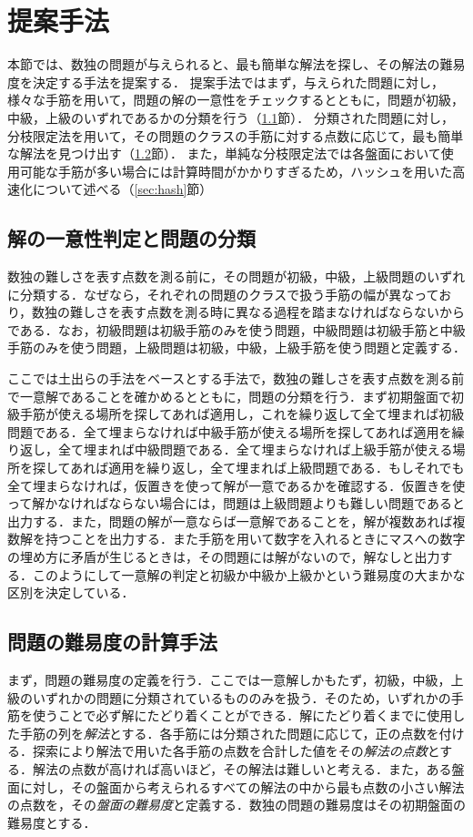 \documentclass[submit,techrep,noauthor]{ipsj}
\begin{document}
\section{提案手法}
本節では、数独の問題が与えられると、最も簡単な解法を探し、その解法の難易度を決定する手法を提案する．
提案手法ではまず，与えられた問題に対し，様々な手筋を用いて，問題の解の一意性をチェックするとともに，問題が初級，中級，上級のいずれであるかの分類を行う（\ref{sec:classify}節）．
分類された問題に対し，分枝限定法を用いて，その問題のクラスの手筋に対する点数に応じて，最も簡単な解法を見つけ出す（\ref{sec:algo}節）．
また，単純な分枝限定法では各盤面において使用可能な手筋が多い場合には計算時間がかかりすぎるため，ハッシュを用いた高速化について述べる（\ref{sec:hash}節）


\subsection{解の一意性判定と問題の分類}
\label{sec:classify}
数独の難しさを表す点数を測る前に，その問題が初級，中級，上級問題のいずれに分類する．なぜなら，それぞれの問題のクラスで扱う手筋の幅が異なっており，数独の難しさを表す点数を測る時に異なる過程を踏まなければならないからである．なお，初級問題は初級手筋のみを使う問題，中級問題は初級手筋と中級手筋のみを使う問題，上級問題は初級，中級，上級手筋を使う問題と定義する．

ここでは土出らの手法をベースとする手法で，数独の難しさを表す点数を測る前で一意解であることを確かめるとともに，問題の分類を行う．まず初期盤面で初級手筋が使える場所を探してあれば適用し，これを繰り返して全て埋まれば初級問題である．全て埋まらなければ中級手筋が使える場所を探してあれば適用を繰り返し，全て埋まれば中級問題である．全て埋まらなければ上級手筋が使える場所を探してあれば適用を繰り返し，全て埋まれば上級問題である．もしそれでも全て埋まらなければ，仮置きを使って解が一意であるかを確認する．仮置きを使って解かなければならない場合には，問題は上級問題よりも難しい問題であると出力する．また，問題の解が一意ならば一意解であることを，解が複数あれば複数解を持つことを出力する．また手筋を用いて数字を入れるときにマスへの数字の埋め方に矛盾が生じるときは，その問題には解がないので，解なしと出力する．このようにして一意解の判定と初級か中級か上級かという難易度の大まかな区別を決定している．


\subsection{問題の難易度の計算手法}
\label{sec:algo}

まず，問題の難易度の定義を行う．ここでは一意解しかもたず，初級，中級，上級のいずれかの問題に分類されているもののみを扱う．そのため，いずれかの手筋を使うことで必ず解にたどり着くことができる．解にたどり着くまでに使用した手筋の列を\emph{解法}とする．各手筋には分類された問題に応じて，正の点数を付ける．探索により解法で用いた各手筋の点数を合計した値をその\emph{解法の点数}とする．解法の点数が高ければ高いほど，その解法は難しいと考える．また，ある盤面に対し，その盤面から考えられるすべての解法の中から最も点数の小さい解法の点数を，その\emph{盤面の難易度}と定義する．数独の問題の難易度はその初期盤面の難易度とする．
\end{document}
